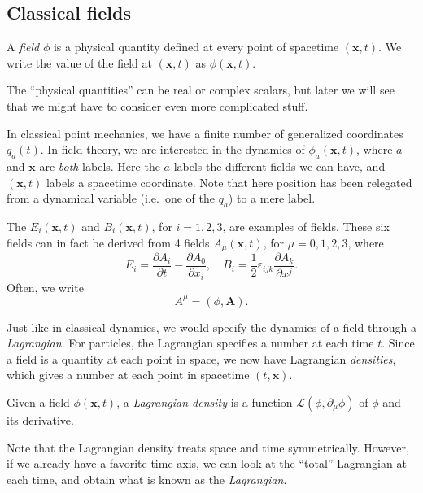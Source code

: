 \documentclass[a4paper]{article}
\begin{document}
\subsection{Classical fields}
\begin{defi}[Field]
  A \emph{field} $\phi$ is a physical quantity defined at every point of spacetime $(\mathbf{x}, t)$. We write the value of the field at $(\mathbf{x}, t)$ as $\phi(\mathbf{x}, t)$.
\end{defi}
The ``physical quantities'' can be real or complex scalars, but later we will see that we might have to consider even more complicated stuff.

In classical point mechanics, we have a finite number of generalized coordinates $q_a(t)$. In field theory, we are interested in the dynamics of $\phi_a(\mathbf{x}, t)$, where $a$ and $\mathbf{x}$ are \emph{both} labels. Here the $a$ labels the different fields we can have, and $(\mathbf{x}, t)$ labels a spacetime coordinate. Note that here position has been relegated from a dynamical variable (i.e.\ one of the $q_a$) to a mere label.

\begin{eg}
  The  $E_i(\mathbf{x}, t)$ and  $B_i(\mathbf{x}, t)$, for $i = 1, 2, 3$, are examples of fields. These six fields can in fact be derived from 4 fields $A_\mu(\mathbf{x}, t)$, for $\mu = 0, 1, 2, 3$, where
  \[
    E_i = \frac{\partial A_i}{\partial t} - \frac{\partial A_0}{\partial x_i},\quad B_i = \frac{1}{2} \varepsilon_{ijk}\frac{\partial A_k}{\partial x^j}.
  \]
  Often, we write
  \[
    A^\mu = (\phi, \mathbf{A}).
  \]
\end{eg}

Just like in classical dynamics, we would specify the dynamics of a field through a \emph{Lagrangian}. For particles, the Lagrangian specifies a number at each time $t$. Since a field is a quantity at each point in space, we now have Lagrangian \emph{densities}, which gives a number at each point in spacetime $(t, \mathbf{x})$.

\begin{defi}
  Given a field $\phi (\mathbf{x}, t)$, a \emph{Lagrangian density} is a function $\mathcal{L}(\phi, \partial_\mu \phi)$ of $\phi$ and its derivative.
\end{defi}

Note that the Lagrangian density treats space and time symmetrically. However, if we already have a favorite time axis, we can look at the ``total'' Lagrangian at each time, and obtain what is known as the \emph{Lagrangian}.
\end{document}
